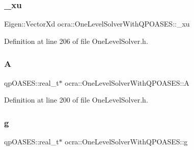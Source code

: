 \hypertarget{classocra_1_1OneLevelSolverWithQPOASES_a23dd435ea8582fc67bf77373e0afc3e0}{}\label{classocra_1_1OneLevelSolverWithQPOASES_a23dd435ea8582fc67bf77373e0afc3e0} 
\subsubsection{\texorpdfstring{\+\_\+xu}{\_xu}}
{\footnotesize\ttfamily Eigen\+::\+Vector\+Xd ocra\+::\+One\+Level\+Solver\+With\+Q\+P\+O\+A\+S\+E\+S\+::\+\_\+xu\hspace{0.3cm}{\ttfamily [protected]}}



Definition at line 206 of file One\+Level\+Solver.\+h.

\hypertarget{classocra_1_1OneLevelSolverWithQPOASES_a8263c27c6bda731ab9dc9550a668e491}{}\label{classocra_1_1OneLevelSolverWithQPOASES_a8263c27c6bda731ab9dc9550a668e491} 
\subsubsection{\texorpdfstring{A}{A}}
{\footnotesize\ttfamily qp\+O\+A\+S\+E\+S\+::real\+\_\+t$\ast$ ocra\+::\+One\+Level\+Solver\+With\+Q\+P\+O\+A\+S\+E\+S\+::A\hspace{0.3cm}{\ttfamily [protected]}}



Definition at line 200 of file One\+Level\+Solver.\+h.

\hypertarget{classocra_1_1OneLevelSolverWithQPOASES_a56fea8397d0c6b40fee373d8863f0b26}{}\label{classocra_1_1OneLevelSolverWithQPOASES_a56fea8397d0c6b40fee373d8863f0b26} 
\subsubsection{\texorpdfstring{g}{g}}
{\footnotesize\ttfamily qp\+O\+A\+S\+E\+S\+::real\+\_\+t$\ast$ ocra\+::\+One\+Level\+Solver\+With\+Q\+P\+O\+A\+S\+E\+S\+::g\hspace{0.3cm}{\ttfamily [protected]}}



